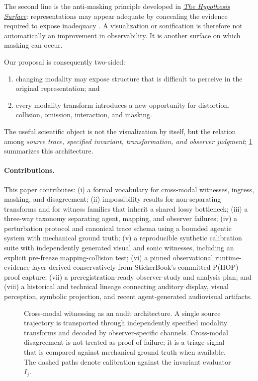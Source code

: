\documentclass[11pt]{article}
\begin{document}
The second line is the anti-masking principle developed in \href{https://github.com/PaulTiffany/hypothesis-surface-agi26}{\emph{The Hypothesis Surface}}: representations may appear adequate by concealing the evidence required to expose inadequacy \citep{tiffany2026surface}. A visualization or sonification is therefore not automatically an improvement in observability. It is another surface on which masking can occur.

Our proposal is consequently two-sided:
\begin{enumerate}[label=(\arabic*)]
    \item changing modality may expose structure that is difficult to perceive in the original representation; and
    \item every modality transform introduces a new opportunity for distortion, collision, omission, interaction, and masking.
\end{enumerate}
The useful scientific object is not the visualization by itself, but the relation among \emph{source trace, specified invariant, transformation, and observer judgment}; \cref{fig:crossmodal-pipeline} summarizes this architecture.

\paragraph{Contributions.}
This paper contributes: (i) a formal vocabulary for cross-modal witnesses, ingress, masking, and disagreement; (ii) impossibility results for non-separating transforms and for witness families that inherit a shared lossy bottleneck; (iii) a three-way taxonomy separating agent, mapping, and observer failures; (iv) a perturbation protocol and canonical trace schema using a bounded agentic system with mechanical ground truth; (v) a reproducible synthetic calibration suite with independently generated visual and sonic witnesses, including an explicit pre-freeze mapping-collision test; (vi) a pinned observational runtime-evidence layer derived conservatively from StickerBook's committed P(HOP) proof capture; (vii) a preregistration-ready observer-study and analysis plan; and (viii) a historical and technical lineage connecting auditory display, visual perception, symbolic projection, and recent agent-generated audiovisual artifacts.

\begin{figure}[t]
\centering
\resizebox{0.98\textwidth}{!}{}
\caption{Cross-modal witnessing as an audit architecture. A single source trajectory is transported through independently specified modality transforms and decoded by observer-specific channels. Cross-modal disagreement is not treated as proof of failure; it is a triage signal that is compared against mechanical ground truth when available. The dashed paths denote calibration against the invariant evaluator $I_j$.}
\label{fig:crossmodal-pipeline}
\end{figure}
\end{document}
